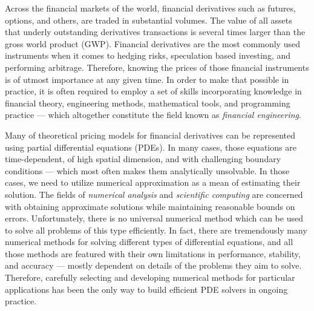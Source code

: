 \documentclass{UUThesisTemplate}
\begin{document}
\par
Across the financial markets of the world, financial derivatives such as futures, options, and others, are traded in substantial volumes. The value of all assets that underly outstanding derivatives transactions is several times larger than the gross world product (GWP). Financial derivatives are the most commonly used instruments when it comes to hedging risks, speculation based investing, and performing arbitrage. Therefore, knowing the prices of those financial instruments is of utmost importance at any given time. In order to make that possible in practice, it is often required to employ a set of skills incorporating knowledge in financial theory, engineering methods, mathematical tools, and programming practice --- which altogether constitute the field known as \emph{financial engineering}. 

\par
Many of theoretical pricing models for financial derivatives can be represented using partial differential equations (PDEs). In many cases, those equations are time-dependent, of high spatial dimension, and with challenging boundary conditions --- which most often makes them analytically unsolvable. In those cases, we need to utilize numerical approximation as a mean of estimating their solution. The fields of \emph{numerical analysis} and \emph{scientific computing} are concerned with obtaining approximate solutions while maintaining reasonable bounds on errors. Unfortunately, there is no universal numerical method which can be used to solve all problems of this type efficiently. In fact, there are tremendously many numerical methods for solving different types of differential equations, and all those methods are featured with their own limitations in performance, stability, and accuracy --- mostly dependent on details of the problems they aim to solve. Therefore, carefully selecting and developing numerical methods for particular applications has been the only way to build efficient PDE solvers in ongoing practice. 
\end{document}
